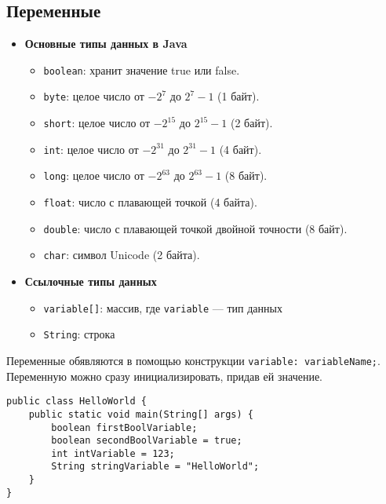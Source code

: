 \subsection{Переменные}
\begin{itemize}
    \item \textbf{Основные типы данных в Java}
    \begin{itemize}
        \item \texttt{boolean}: хранит значение true или false.
        \item \texttt{byte}: целое число от $-2^{7}$ до $2^{7} - 1$ (1 байт).
        \item \texttt{short}: целое число от $-2^{15}$ до $2^{15} - 1$ (2 байт).
        \item \texttt{int}: целое число от $-2^{31}$ до $2^{31} - 1$ (4 байт).
        \item \texttt{long}: целое число от $-2^{63}$ до $2^{63} - 1$ (8 байт).
        \item \texttt{float}: число с плавающей точкой (4 байта).
        \item \texttt{double}: число с плавающей точкой двойной точности (8 байт).
        \item \texttt{char}: символ Unicode (2 байта).
    \end{itemize}
    \item \textbf{Ссылочные типы данных}
    \begin{itemize}
        \item \texttt{variable[]}: массив, где \texttt{variable} — тип данных
        \item \texttt{String}: строка
    \end{itemize}
\end{itemize}


Переменные обявляются в помощью конструкции \texttt{variable: variableName;}.\\
Переменную можно сразу инициализировать, придав ей значение.
\begin{verbatim}
public class HelloWorld {
    public static void main(String[] args) {
        boolean firstBoolVariable;
        boolean secondBoolVariable = true;
        int intVariable = 123;
        String stringVariable = "HelloWorld";
    }
}
\end{verbatim}

